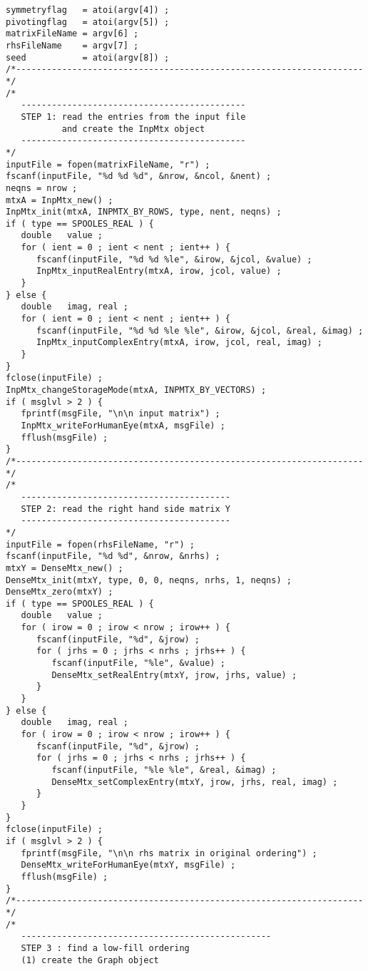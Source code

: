 \begin{verbatim}
symmetryflag   = atoi(argv[4]) ;
pivotingflag   = atoi(argv[5]) ;
matrixFileName = argv[6] ;
rhsFileName    = argv[7] ;
seed           = atoi(argv[8]) ;
/*--------------------------------------------------------------------*/
/*
   --------------------------------------------
   STEP 1: read the entries from the input file 
           and create the InpMtx object
   --------------------------------------------
*/
inputFile = fopen(matrixFileName, "r") ;
fscanf(inputFile, "%d %d %d", &nrow, &ncol, &nent) ;
neqns = nrow ;
mtxA = InpMtx_new() ;
InpMtx_init(mtxA, INPMTX_BY_ROWS, type, nent, neqns) ;
if ( type == SPOOLES_REAL ) {
   double   value ;
   for ( ient = 0 ; ient < nent ; ient++ ) {
      fscanf(inputFile, "%d %d %le", &irow, &jcol, &value) ;
      InpMtx_inputRealEntry(mtxA, irow, jcol, value) ;
   }
} else {
   double   imag, real ;
   for ( ient = 0 ; ient < nent ; ient++ ) {
      fscanf(inputFile, "%d %d %le %le", &irow, &jcol, &real, &imag) ;
      InpMtx_inputComplexEntry(mtxA, irow, jcol, real, imag) ;
   }
}
fclose(inputFile) ;
InpMtx_changeStorageMode(mtxA, INPMTX_BY_VECTORS) ;
if ( msglvl > 2 ) {
   fprintf(msgFile, "\n\n input matrix") ;
   InpMtx_writeForHumanEye(mtxA, msgFile) ;
   fflush(msgFile) ;
}
/*--------------------------------------------------------------------*/
/*
   -----------------------------------------
   STEP 2: read the right hand side matrix Y
   -----------------------------------------
*/
inputFile = fopen(rhsFileName, "r") ;
fscanf(inputFile, "%d %d", &nrow, &nrhs) ;
mtxY = DenseMtx_new() ;
DenseMtx_init(mtxY, type, 0, 0, neqns, nrhs, 1, neqns) ;
DenseMtx_zero(mtxY) ;
if ( type == SPOOLES_REAL ) {
   double   value ;
   for ( irow = 0 ; irow < nrow ; irow++ ) {
      fscanf(inputFile, "%d", &jrow) ;
      for ( jrhs = 0 ; jrhs < nrhs ; jrhs++ ) {
         fscanf(inputFile, "%le", &value) ;
         DenseMtx_setRealEntry(mtxY, jrow, jrhs, value) ;
      }
   }
} else {
   double   imag, real ;
   for ( irow = 0 ; irow < nrow ; irow++ ) {
      fscanf(inputFile, "%d", &jrow) ;
      for ( jrhs = 0 ; jrhs < nrhs ; jrhs++ ) {
         fscanf(inputFile, "%le %le", &real, &imag) ;
         DenseMtx_setComplexEntry(mtxY, jrow, jrhs, real, imag) ;
      }
   }
}
fclose(inputFile) ;
if ( msglvl > 2 ) {
   fprintf(msgFile, "\n\n rhs matrix in original ordering") ;
   DenseMtx_writeForHumanEye(mtxY, msgFile) ;
   fflush(msgFile) ;
}
/*--------------------------------------------------------------------*/
/*
   -------------------------------------------------
   STEP 3 : find a low-fill ordering
   (1) create the Graph object

\end{verbatim}
